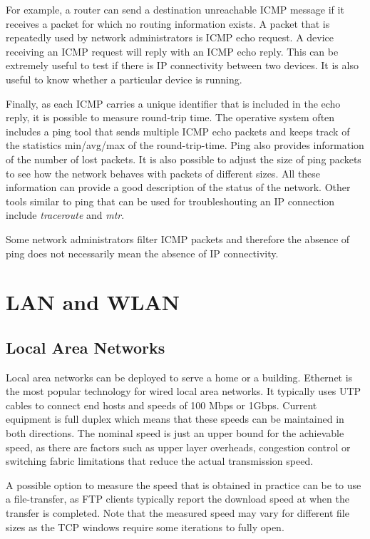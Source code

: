 For example, a router can send a destination unreachable ICMP message if it receives a packet for which no routing information exists.
A packet that is repeatedly used by network administrators is ICMP echo request.
A device receiving an ICMP request will reply with an ICMP echo reply.
This can be extremely useful to test if there is IP connectivity between two devices.
It is also useful to know whether a particular device is running.

Finally, as each ICMP carries a unique identifier that is included in the echo reply, it is possible to measure round-trip time.
The operative system often includes a ping tool that sends multiple ICMP echo packets and keeps track of the statistics min/avg/max of the round-trip-time.
Ping also provides information of the number of lost packets.
It is also possible to adjust the size of ping packets to see how the network behaves with packets of different sizes.
All these information can provide a good description of the status of the network.
Other tools similar to ping that can be used for troubleshouting an IP connection include \emph{traceroute} and \emph{mtr}.

Some network administrators filter ICMP packets and therefore the absence of ping does not necessarily mean the absence of IP connectivity.

\section{LAN and WLAN}

\subsection{Local Area Networks}

Local area networks can be deployed to serve a home or a building.
Ethernet is the most popular technology for wired local area networks.
It typically uses UTP cables to connect end hosts and speeds of 100 Mbps or 1Gbps.
Current equipment is full duplex which means that these speeds can be maintained in both directions.
The nominal speed is just an upper bound for the achievable speed, as there are factors such as upper layer overheads, congestion control or switching fabric limitations that reduce the actual transmission speed.

A possible option to measure the speed that is obtained in practice can be to use a file-transfer, as FTP clients typically report the download speed at when the transfer is completed.
Note that the measured speed may vary for different file sizes as the TCP windows require some iterations to fully open.

